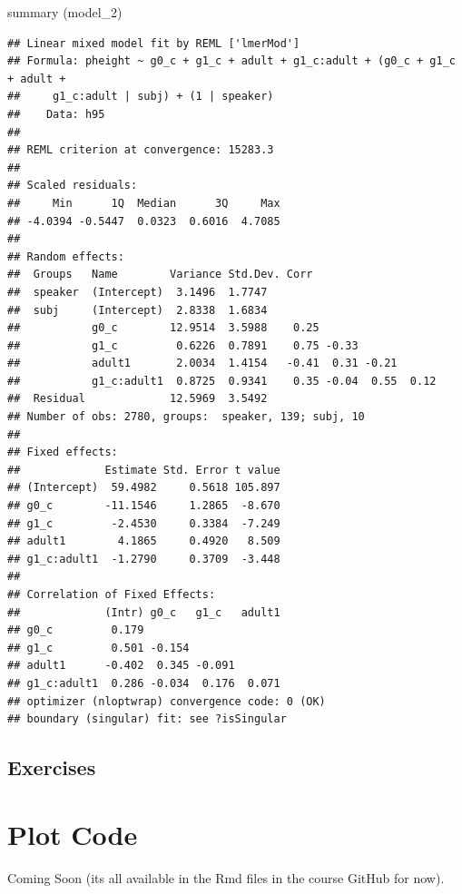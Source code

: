 \documentclass[
]{book}
\newenvironment{Shaded}{\begin{snugshade}}{\end{snugshade}}
\newcommand{\FunctionTok}[1]{\textcolor[rgb]{0.00,0.00,0.00}{#1}}
\newcommand{\NormalTok}[1]{#1}
\begin{document}
\begin{Shaded}
\begin{Highlighting}[]
\FunctionTok{summary}\NormalTok{ (model\_2)}
\end{Highlighting}
\end{Shaded}

\begin{verbatim}
## Linear mixed model fit by REML ['lmerMod']
## Formula: pheight ~ g0_c + g1_c + adult + g1_c:adult + (g0_c + g1_c + adult +  
##     g1_c:adult | subj) + (1 | speaker)
##    Data: h95
## 
## REML criterion at convergence: 15283.3
## 
## Scaled residuals: 
##     Min      1Q  Median      3Q     Max 
## -4.0394 -0.5447  0.0323  0.6016  4.7085 
## 
## Random effects:
##  Groups   Name        Variance Std.Dev. Corr                   
##  speaker  (Intercept)  3.1496  1.7747                          
##  subj     (Intercept)  2.8338  1.6834                          
##           g0_c        12.9514  3.5988    0.25                  
##           g1_c         0.6226  0.7891    0.75 -0.33            
##           adult1       2.0034  1.4154   -0.41  0.31 -0.21      
##           g1_c:adult1  0.8725  0.9341    0.35 -0.04  0.55  0.12
##  Residual             12.5969  3.5492                          
## Number of obs: 2780, groups:  speaker, 139; subj, 10
## 
## Fixed effects:
##             Estimate Std. Error t value
## (Intercept)  59.4982     0.5618 105.897
## g0_c        -11.1546     1.2865  -8.670
## g1_c         -2.4530     0.3384  -7.249
## adult1        4.1865     0.4920   8.509
## g1_c:adult1  -1.2790     0.3709  -3.448
## 
## Correlation of Fixed Effects:
##             (Intr) g0_c   g1_c   adult1
## g0_c         0.179                     
## g1_c         0.501 -0.154              
## adult1      -0.402  0.345 -0.091       
## g1_c:adult1  0.286 -0.034  0.176  0.071
## optimizer (nloptwrap) convergence code: 0 (OK)
## boundary (singular) fit: see ?isSingular
\end{verbatim}

\hypertarget{exercises-5}{%
\section{Exercises}\label{exercises-5}}

\hypertarget{plot-code}{%
\chapter{Plot Code}\label{plot-code}}

Coming Soon (its all available in the Rmd files in the course GitHub for now).
\end{document}
